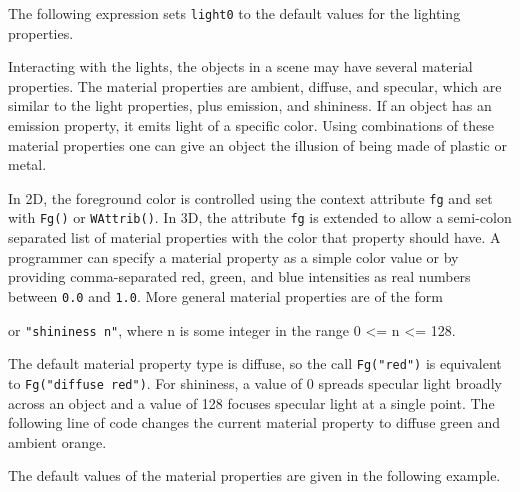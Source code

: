 
\noindent
The following expression sets \texttt{light0} to the default values for
the lighting properties.



Interacting with the lights, the objects in a scene may have several
material properties. The material properties are ambient, diffuse, and
specular, which are similar to the light properties, plus emission,
and shininess. If an object has an emission property, it emits light
of a specific color. Using combinations of these material properties
one can give an object the illusion of being made of plastic or metal.

In 2D, the foreground color is controlled using the context attribute
\texttt{fg} and set with \texttt{Fg()} or \texttt{WAttrib()}.  In 3D,
the attribute \texttt{fg} is extended to allow a semi-colon separated
list of material properties with the color that property should have.
A programmer can specify a material property as a simple color value
or by providing comma-separated red, green, and blue intensities as
real numbers between \texttt{0.0} and \texttt{1.0}.  More general
material properties are of the form


\noindent
or \texttt{"shininess n"}, where n is some integer
in the range 0 {\textless}= n {\textless}= 128.

The default material property type is diffuse, so the call
\texttt{Fg("red")} is equivalent to \texttt{Fg("diffuse red")}. For
shininess, a value of 0 spreads specular light broadly across an
object and a value of 128 focuses specular light at a single
point. The following line of code changes the current material
property to diffuse green and ambient orange.



\noindent The default values of the material properties are given in the
following example. 


